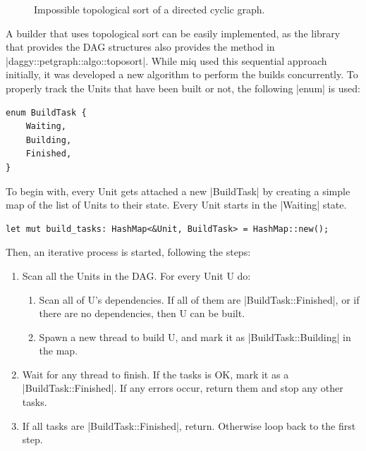 \begin{figure}[hbtp]
    \centerfloat
    
    \caption{Impossible topological sort of a directed cyclic graph.}
    \label{fig:toposort3}
\end{figure}

\FloatBarrier

A builder that uses topological sort can be easily
implemented, as the library that provides the \ac{DAG}
structures also provides the method in
|daggy::petgraph::algo::toposort|. While miq used this
sequential approach initially, it was developed a new
algorithm to perform the builds concurrently. To properly
track the Units that have been built or not, the following
|enum| is used:

\begin{verbatim}
enum BuildTask {
    Waiting,
    Building,
    Finished,
}
\end{verbatim}

To begin with, every Unit gets attached a new |BuildTask| by
creating a simple map of the list of Units to their state.
Every Unit starts in the |Waiting| state.

\begin{verbatim}
let mut build_tasks: HashMap<&Unit, BuildTask> = HashMap::new();
\end{verbatim}

Then, an iterative process is started, following the steps:

\begin{enumerate}
    \item Scan all the Units in the \ac{DAG}. For every Unit U do:
    \begin{enumerate}
        \item Scan all of U's dependencies. If all of them
        are |BuildTask::Finished|, or if there are no dependencies,
        then U can be built.
        \item Spawn a new thread to build U, and mark it as
        |BuildTask::Building| in the map.
    \end{enumerate}
    \item Wait for any thread to finish. If the tasks is OK,
    mark it as a |BuildTask::Finished|. If any errors occur,
    return them and stop any other tasks.
    \item If all tasks are |BuildTask::Finished|, return.
    Otherwise loop back to the first step.
\end{enumerate}

